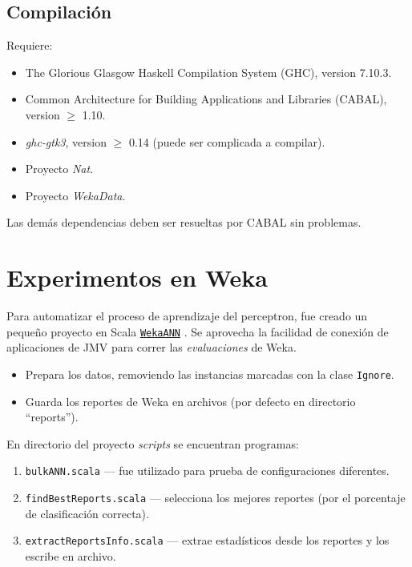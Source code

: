 \documentclass{article}
\newcommand\refcode[2]{ \href{#1}{\texttt{#2}} }
\begin{document}
\subsection{Compilación}

Requiere:
\begin{itemize}
    \item The Glorious Glasgow Haskell Compilation System (GHC), version 7.10.3.
    \item Common Architecture for Building Applications and Libraries (CABAL),
          version $\geq$ 1.10.
    \item \emph{ghc-gtk3}, version $\geq$ 0.14 (puede ser complicada a compilar).
    \item Proyecto \emph{Nat}.
    \item Proyecto \emph{WekaData}.
\end{itemize}

Las demás dependencias deben ser resueltas por CABAL sin problemas.

\section{Experimentos en Weka}

Para automatizar el proceso de aprendizaje del perceptron, fue creado un pequeño proyecto en Scala \refcode{\WekaANN}{WekaANN}. Se aprovecha la facilidad de conexión de aplicaciones de JMV para correr las \emph{evaluaciones} de Weka.

\begin{itemize}
\item Prepara los datos, removiendo las instancias marcadas con la clase 
    \verb|Ignore|.
\item Guarda los reportes de Weka en archivos (por defecto en directorio ``reports'').
\end{itemize}

\medskip
En directorio del proyecto \emph{scripts} se encuentran programas:
\begin{enumerate}
\item \verb|bulkANN.scala| --- fue utilizado para prueba de configuraciones diferentes.
\item \verb|findBestReports.scala| --- selecciona los mejores reportes (por el porcentaje de clasificación correcta).
\item \verb|extractReportsInfo.scala| --- extrae estadísticos desde los reportes y los escribe en archivo.
\end{enumerate}
\end{document}
